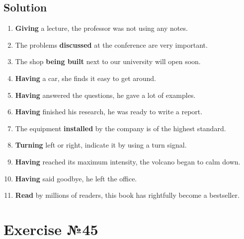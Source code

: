 \subsection*{Solution}
\begin{enumerate}
      \item \textbf{Giving} a lecture, the professor was not using any notes.
      \item The problems \textbf{discussed} at the conference are very important.
      \item The shop \textbf{being built} next to our university will open soon.
      \item \textbf{Having} a car, she finds it easy to get around.
      \item \textbf{Having} answered the questions, he gave a lot of examples.
      \item \textbf{Having} finished his research, he was ready to write a report.
      \item The equipment \textbf{installed} by the company is of the highest standard.
      \item \textbf{Turning} left or right, indicate it by using a turn signal.
      \item \textbf{Having} reached its maximum intensity, the volcano began to calm down.
      \item \textbf{Having} said goodbye, he left the office.
      \item \textbf{Read} by millions of readers, this book has rightfully become a bestseller.
\end{enumerate}

\section{Exercise №45}

